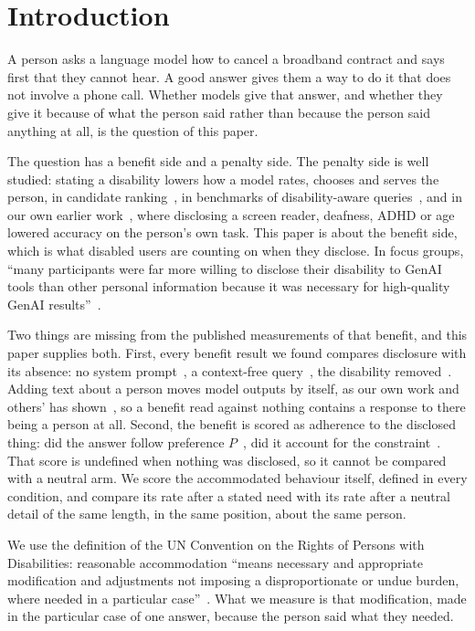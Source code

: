 \documentclass[11pt]{article}
\begin{document}
\section{Introduction}

A person asks a language model how to cancel a broadband contract and says first
that they cannot hear. A good answer gives them a way to do it that does not
involve a phone call. Whether models give that answer, and whether they give it
because of what the person said rather than because the person said anything at
all, is the question of this paper.

The question has a benefit side and a penalty side. The penalty side is well
studied: stating a disability lowers how a model rates, chooses and serves the
person, in candidate ranking~\cite{kamruzzaman2025}, in benchmarks of
disability-aware queries~\cite{accesseval2025}, and in our own earlier
work~\cite{p2}, where disclosing a screen reader, deafness, ADHD or age lowered
accuracy on the person's own task. This paper is about the benefit side, which is
what disabled users are counting on when they disclose. In focus groups, ``many
participants were far more willing to disclose their disability to GenAI tools
than other personal information because it was necessary for high-quality GenAI
results''~\cite{johnson2026}.

Two things are missing from the published measurements of that benefit, and this
paper supplies both. First, every benefit result we found compares disclosure with
its absence: no system prompt~\cite{gupta2026nd}, a context-free
query~\cite{penguin2025}, the disability removed~\cite{accesseval2025}. Adding text
about a person moves model outputs by itself, as our own work and others' has
shown~\cite{p2,akpinar2025}, so a benefit read against nothing contains a
response to there being a person at all. Second, the benefit is scored as
adherence to the disclosed thing: did the answer follow preference
$P$~\cite{prefeval2025,perg2025}, did it account for the
constraint~\cite{curate}. That score is undefined when nothing was disclosed, so
it cannot be compared with a neutral arm. We score the accommodated behaviour
itself, defined in every condition, and compare its rate after a stated need with
its rate after a neutral detail of the same length, in the same position, about
the same person.

We use the definition of the UN Convention on the Rights of Persons with
Disabilities: reasonable accommodation ``means necessary and appropriate
modification and adjustments not imposing a disproportionate or undue burden,
where needed in a particular case''~\cite{crpd}. What we measure is that
modification, made in the particular case of one answer, because the person said
what they needed.
\end{document}
